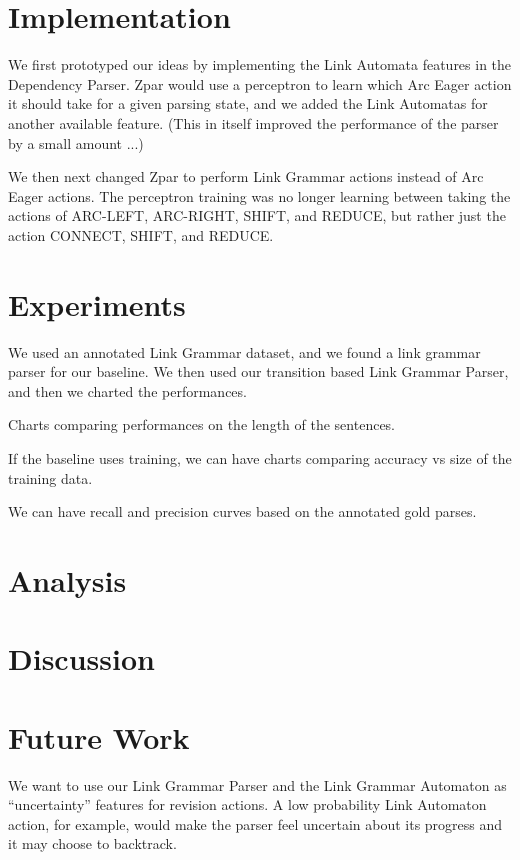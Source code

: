 \documentclass[11pt]{article}
\begin{document}
\section{Implementation}
We first prototyped our ideas by implementing the Link Automata features in the Dependency Parser. Zpar would use a perceptron to learn which Arc Eager action it should take for a given parsing state, and we added the Link Automatas for another available feature. (This in itself improved the performance of the parser by a small amount ...)

We then next changed Zpar to perform Link Grammar actions instead of Arc Eager actions. The perceptron training was no longer learning between taking the actions of ARC-LEFT, ARC-RIGHT, SHIFT, and REDUCE, but rather just the action CONNECT, SHIFT, and REDUCE.







\section{Experiments}

We used an annotated Link Grammar dataset, and we found a link grammar parser for our baseline. We then used our transition based Link Grammar Parser, and then we charted the performances.

Charts comparing performances on the length of the sentences. 

If the baseline uses training, we can have charts comparing accuracy vs size of the training data.

We can have recall and precision curves based on the annotated gold parses.


\section{Analysis}


\section{Discussion}



\section{Future Work}
We want to use our Link Grammar Parser and the Link Grammar Automaton as ``uncertainty'' features for revision actions. A low probability Link Automaton action, for example, would make the parser feel uncertain about its progress and it may choose to backtrack.
\end{document}
